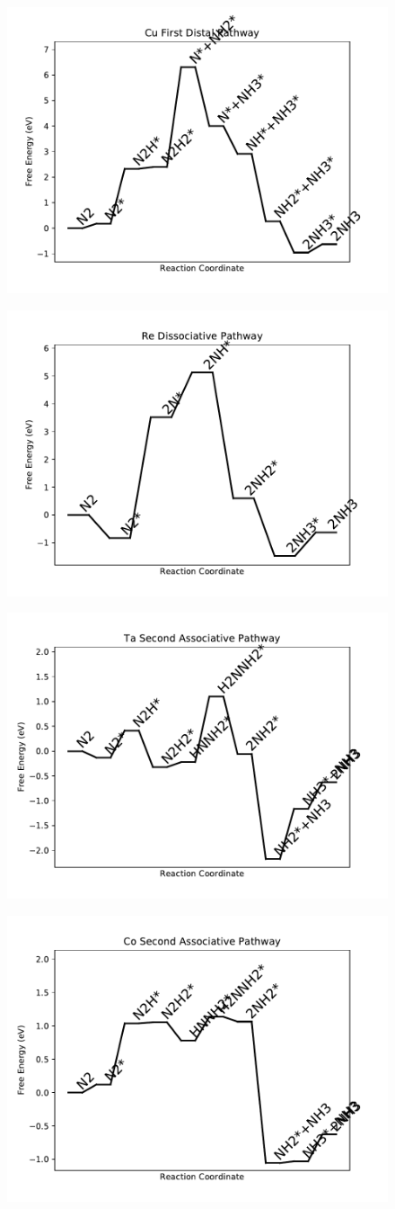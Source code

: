 \documentclass[journal=jacsat,manuscript=article]{achemso}
\begin{document}
\begin{figure}
\includegraphics[width=0.5\linewidth]{data/plots/Cu_distal_1.pdf}
\label{fig:Cu_distal_1}
\end{figure}

\newpage
\begin{figure}
\includegraphics[width=0.5\linewidth]{data/plots/Re_dissociative.pdf}
\label{fig:Re_dissociative}
\end{figure}

\begin{figure}
\includegraphics[width=0.5\linewidth]{data/plots/Ta_associative_2.pdf}
\label{fig:Ta_associative_2}
\end{figure}

\newpage
\begin{figure}
\includegraphics[width=0.5\linewidth]{data/plots/Co_associative_2.pdf}
\label{fig:Co_associative_2}
\end{figure}
\end{document}
